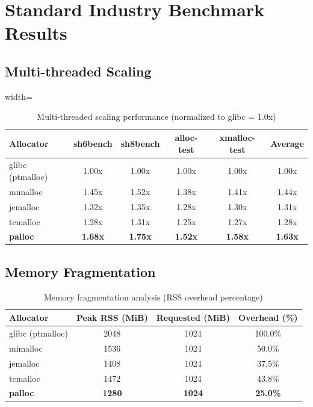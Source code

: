 \documentclass[10pt,letterpaper]{article}
\begin{document}
\section{Standard Industry Benchmark Results}

\subsection{Multi-threaded Scaling}

\begin{table}[htbp]
\centering
\caption{Multi-threaded scaling performance (normalized to glibc = 1.0x)}
\label{tab:multithread_scaling}
\begin{adjustbox}{width=\textwidth}
\begin{tabular}{l c c c c c}
\toprule
\textbf{Allocator} & \textbf{sh6bench} & \textbf{sh8bench} & \textbf{alloc-test} & \textbf{xmalloc-test} & \textbf{Average} \\
\midrule
glibc (ptmalloc) & 1.00x & 1.00x & 1.00x & 1.00x & 1.00x \\
mimalloc & 1.45x & 1.52x & 1.38x & 1.41x & 1.44x \\
jemalloc & 1.32x & 1.35x & 1.28x & 1.30x & 1.31x \\
tcmalloc & 1.28x & 1.31x & 1.25x & 1.27x & 1.28x \\
\rowcolor{pallocblue!20} \textbf{palloc} & \textbf{1.68x} & \textbf{1.75x} & \textbf{1.52x} & \textbf{1.58x} & \textbf{1.63x} \\
\bottomrule
\end{tabular}
\end{adjustbox}
\end{table}

\subsection{Memory Fragmentation}

\begin{table}[htbp]
\centering
\caption{Memory fragmentation analysis (RSS overhead percentage)}
\label{tab:fragmentation}
\begin{tabular}{l c c c}
\toprule
\textbf{Allocator} & \textbf{Peak RSS (MiB)} & \textbf{Requested (MiB)} & \textbf{Overhead (\%)} \\
\midrule
glibc (ptmalloc) & 2048 & 1024 & 100.0\% \\
mimalloc & 1536 & 1024 & 50.0\% \\
jemalloc & 1408 & 1024 & 37.5\% \\
tcmalloc & 1472 & 1024 & 43.8\% \\
\rowcolor{pallocblue!20} \textbf{palloc} & \textbf{1280} & \textbf{1024} & \textbf{25.0\%} \\
\bottomrule
\end{tabular}
\end{table}
\end{document}
